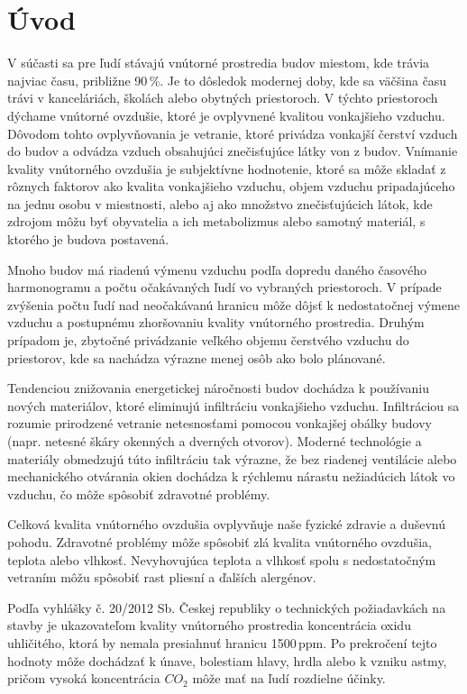 \chapter{Úvod}
V súčasti sa pre ľudí stávajú vnútorné prostredia budov miestom, kde trávia najviac času, približne 90\,\%. Je to dôsledok modernej doby, kde sa väčšina času trávi v kanceláriách, školách alebo obytných priestoroch. V týchto priestoroch dýchame vnútorné ovzdušie, ktoré je ovplyvnené kvalitou vonkajšieho vzduchu. Dôvodom tohto ovplyvňovania je vetranie, ktoré privádza vonkajší čerství vzduch do budov a odvádza vzduch obsahujúci znečisťujúce látky von z budov. Vnímanie kvality vnútorného ovzdušia je subjektívne hodnotenie, ktoré sa môže skladať z rôznych faktorov ako kvalita vonkajšieho vzduchu, objem vzduchu pripadajúceho na jednu osobu v miestnosti, alebo aj ako množstvo znečisťujúcich látok, kde zdrojom môžu byť obyvatelia a ich metabolizmus alebo samotný materiál, s ktorého je budova postavená. 

Mnoho budov má riadenú výmenu vzduchu podľa dopredu daného časového harmonogramu a počtu očakávaných ľudí vo vybraných priestoroch. V prípade zvýšenia počtu ľudí nad neočakávanú hranicu môže dôjsť k nedostatočnej výmene vzduchu a postupnému zhoršovaniu kvality vnútorného prostredia. Druhým prípadom je, zbytočné privádzanie veľkého objemu čerstvého vzduchu do priestorov, kde sa nachádza výrazne menej osôb ako bolo plánované.

Tendenciou znižovania energetickej náročnosti budov dochádza k používaniu nových materiálov, ktoré eliminujú infiltráciu vonkajšieho vzduchu. Infiltráciou sa rozumie prirodzené vetranie netesnosťami pomocou vonkajšej obálky budovy (napr. netesné škáry okenných a dverných otvorov). Moderné technológie a materiály obmedzujú túto infiltráciu tak výrazne, že bez riadenej ventilácie alebo mechanického otvárania okien dochádza k rýchlemu nárastu nežiadúcich látok vo vzduchu, čo môže spôsobiť zdravotné problémy. 

Celková kvalita vnútorného ovzdušia ovplyvňuje naše fyzické zdravie a duševnú pohodu.  Zdravotné problémy môže spôsobiť zlá kvalita vnútorného ovzdušia, teplota alebo vlhkosť. Nevyhovujúca teplota a vlhkosť spolu s nedostatočným vetraním môžu spôsobiť rast pliesní a ďalších alergénov. 

Podľa vyhlášky č. 20/2012 Sb. Českej republiky o technických požiadavkách na stavby je ukazovateľom kvality vnútorného prostredia koncentrácia oxidu uhličitého, ktorá by nemala presiahnuť hranicu 1500\,ppm. Po prekročení tejto hodnoty môže dochádzať k únave, bolestiam hlavy, hrdla alebo k vzniku astmy, pričom vysoká koncentrácia $CO_2$ môže mať na ľudí rozdielne účinky. 

